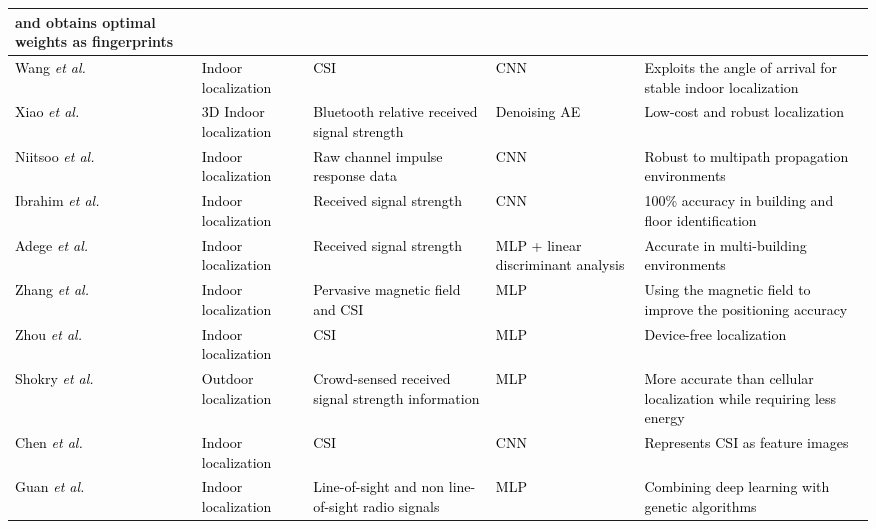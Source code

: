 \documentclass[journal,comsoc,letter]{IEEEtran}
\newcommand{\rev}[1]{\textcolor{black}{#1}}
\begin{document}
\begin{table*}[h!]
\begin{tabular}{|C{2cm}|C{3.5cm}|>{\color{black}}C{2cm}|C{3cm}|C{5cm}|}
{                                    and obtains optimal weights as fingerprints} \\ \hline
\rev{Wang \emph{et al.} \cite{wang2018deep6}}                & \rev{Indoor localization} & \rev{CSI}         & \rev{CNN}      & \rev{Exploits the angle of arrival for stable indoor localization} \\ \hline
\rev{Xiao \emph{et al.} \cite{xiao20173}}                & \rev{3D Indoor localization} & \rev{Bluetooth relative received signal strength}         & \rev{Denoising AE}      & \rev{Low-cost and robust localization} \\ \hline
\rev{Niitsoo \emph{et al.} \cite{niitsoo2018convolutional}}                & \rev{Indoor localization} & \rev{Raw channel impulse response data}         & \rev{CNN}      & \rev{Robust to multipath propagation environments} \\ \hline
\rev{Ibrahim \emph{et al.} \cite{ibrahim2018cnn}}                & \rev{Indoor localization} & \rev{Received signal strength}         & \rev{CNN}      & \rev{100\% accuracy in building and floor identification} \\ \hline
\rev{Adege \emph{et al.} \cite{adege2018applying}}                & \rev{Indoor localization} & \rev{Received signal strength}         & \rev{MLP + linear discriminant analysis}      & \rev{Accurate in multi-building environments} \\ \hline
\rev{Zhang \emph{et al.} \cite{zhang2017deeppositioning}}                & \rev{Indoor localization} & \rev{Pervasive magnetic field and CSI}         & \rev{MLP}      & \rev{Using the magnetic field to improve the positioning accuracy} \\ \hline
\rev{Zhou \emph{et al.} \cite{zhou2018device}}                & \rev{Indoor localization} & \rev{CSI}         & \rev{MLP}      & \rev{Device-free localization } \\ \hline
\rev{Shokry \emph{et al.} \cite{shokry2018deeploc}}                & \rev{Outdoor localization} & \rev{Crowd-sensed received signal strength information}         & \rev{MLP}      & \rev{More accurate than cellular localization while requiring less energy} \\ \hline 
\rev{Chen \emph{et al.} \cite{chen2017confi}}                & \rev{Indoor localization} & \rev{CSI}         & \rev{CNN}      & \rev{Represents CSI as feature images} \\ \hline
\rev{Guan \emph{et al.} \cite{guan2017high}}                & \rev{Indoor localization} & \rev{Line-of-sight and non line-of-sight radio signals}         & \rev{MLP}      & \rev{Combining deep learning with genetic
algorithms} \\ \hline
\end{tabular}
\end{table*}
\end{document}

